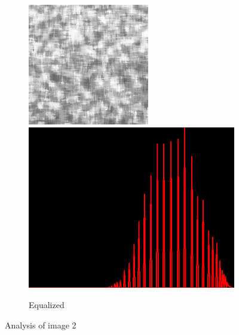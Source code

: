 \begin{figure}[H]
\begin{subfigure}[b]{0.28\textwidth}
        \begin{center}
        	\text{ }
        \end{center}
        \includegraphics[width=\textwidth]{img2/rect_eee_eql_res_total.png}\\[0.1cm]
        \includegraphics[width=\textwidth]{img2/hist_rect_eee_eql_res_total.png}
        \caption{Equalized}
        \label{fig:img2_histEq}
    \end{subfigure}
    \caption{Analysis of image 2}\label{fig:img2}
\end{figure}